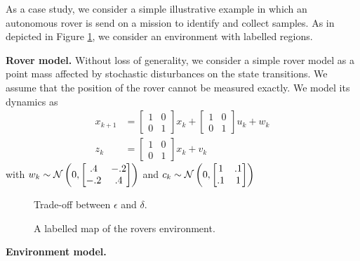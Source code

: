 As a case study, we consider a simple illustrative example in which an autonomous rover is send on a mission to identify and collect samples.
As in depicted in Figure \ref{fig:Scenario}, we consider an environment with labelled regions. 
 


\textbf{Rover model.} Without loss of generality, we consider a simple rover model as a point mass affected by stochastic disturbances on the state transitions. We assume that the position of the rover cannot be measured exactly. 
We model its dynamics as
\begin{align}
	x_{k+1}&=\begin{bmatrix}
		1&0\\
		0&1
	\end{bmatrix} x_{k} + \begin{bmatrix}
		1&0\\
		0&1
	\end{bmatrix} u_k+ w_k\\
z_k&=\begin{bmatrix}
		1&0\\
		0&1
	\end{bmatrix}x_k+v_k
\end{align}
with $w_k\sim \mathcal{N} \left(0,\begin{bmatrix}.4&-.2\\-.2&.4\end{bmatrix}\right)$ and $c_k\sim \mathcal{N} \left(0,\begin{bmatrix}1&.1\\.1&1\end{bmatrix}\right)$

\begin{figure}
	
	\caption{Trade-off between $\epsilon$ and $\delta$.  }
\end{figure}
\begin{figure}
	\caption{A labelled map of the rovers environment. }\label{fig:Scenario}
\end{figure}
\textbf{Environment model.} 



